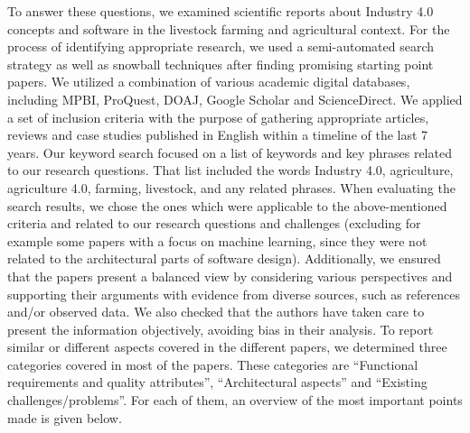 \documentclass[conference]{IEEEtran}
\begin{document}
To answer these questions, we examined scientific reports about Industry 4.0 concepts and software in the livestock farming and agricultural context.
For the process of identifying appropriate research, we used a semi-automated search strategy as well as snowball techniques after finding promising starting point papers. We utilized a combination of various academic digital databases, including MPBI, ProQuest, DOAJ, Google Scholar and ScienceDirect. We applied a set of inclusion criteria with the purpose of gathering appropriate articles, reviews and case studies published in English within a timeline of the last 7 years.
\newline
Our keyword search focused on a list of keywords and key phrases related to our research questions. That list included the words Industry 4.0, agriculture, agriculture 4.0, farming, livestock, and any related phrases. When evaluating the search results, we chose the ones which were applicable to the above-mentioned criteria and related to our research questions and challenges (excluding for example some papers with a focus on machine learning, since they were not related to the architectural parts of software design).
Additionally, we ensured that the papers present a balanced view by considering various perspectives and supporting their arguments with evidence from diverse sources, such as references and/or observed data. We also checked that the authors have taken care to present the information objectively, avoiding bias in their analysis.
\newline
To report similar or different aspects covered in the different papers, we determined three categories covered in most of the papers. These categories are “Functional requirements and quality attributes”, “Architectural aspects” and “Existing challenges/problems”. For each of them, an overview of the most important points made is given below.
\newline
\end{document}

